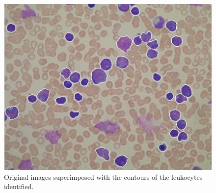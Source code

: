 \documentclass[final,a4paper,12pt,english]{UnicaPhdThesis3}
\begin{document}
{\begin{figure}[!htbp]
\includegraphics[height=0.23\textheight]{images/Fig16-02}
\caption{\label{fig:example16}Original images superimposed with the contours of the leukocytes identified.}
\end{figure}

}
\end{document}
